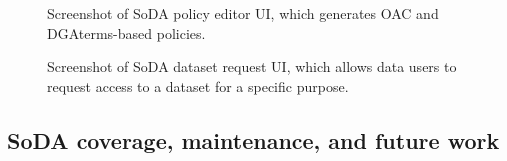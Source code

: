 \begin{figure}[ht]
    \centering
    \caption[Screenshot of SoDA policy editor UI.]{Screenshot of SoDA policy editor UI, which generates OAC and DGAterms-based policies.}
    \label{fig:soda-ds}
\end{figure}

\begin{figure}[ht]
    \centering
    \caption[Screenshot of SoDA dataset request UI.]{Screenshot of SoDA dataset request UI, which allows data users to request access to a dataset for a specific purpose.}
    \label{fig:soda-du}
\end{figure}

\subsection{SoDA coverage, maintenance, and future work}
\label{sec:maintenance_soda}

